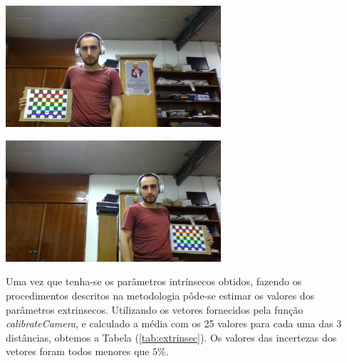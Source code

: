 \begin{minipage}{0.5\textwidth}
\begin{flushright}
\includegraphics[width = 0.6\textwidth]{img/4.png}
\end{flushright}
\end{minipage}
\begin{minipage}{0.5\textwidth}
\begin{flushleft}
\includegraphics[width = 0.6\textwidth]{img/5.png}
\end{flushleft}
\end{minipage}

Uma vez que tenha-se os parâmetros intrínsecos obtidos, fazendo os procedimentos descritos na metodologia pôde-se estimar os valores dos parâmetros extrinsecos. Utilizando os vetores fornecidos pela função \textit{calibrateCamera}, e calculado a média com os 25 valores para cada uma das 3 distâncias, obtemos a Tabela (\ref{tab:extrinsec}). Os valores das incertezas dos vetores foram todos menores que $5\%$.

